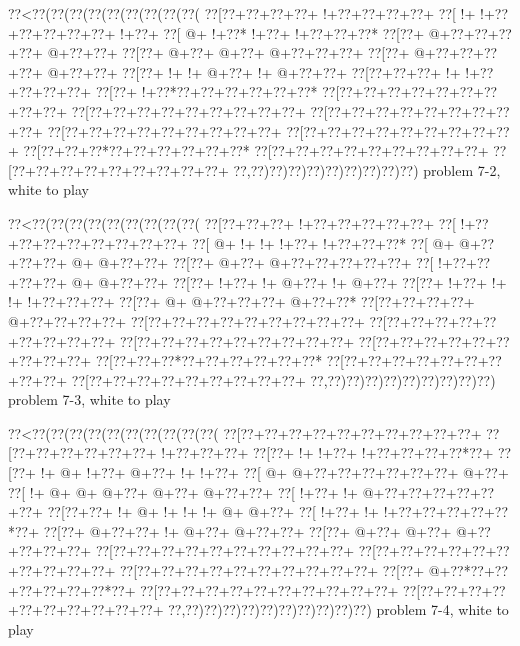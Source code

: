 \vbox{\vbox{\goo
\0??<\0??(\0??(\0??(\0??(\0??(\0??(\0??(\0??(\0??(
\0??[\0??+\0??+\0??+\0??+\- !+\0??+\0??+\0??+\0??+
\0??[\- !+\- !+\0??+\0??+\0??+\0??+\0??+\- !+\0??+
\0??[\- @+\- !+\0??*\- !+\0??+\- !+\0??+\0??+\0??*
\0??[\0??+\- @+\0??+\0??+\0??+\0??+\- @+\0??+\0??+
\0??[\0??+\- @+\0??+\- @+\0??+\- @+\0??+\0??+\0??+
\0??[\0??+\- @+\0??+\0??+\0??+\0??+\- @+\0??+\0??+
\0??[\0??+\- !+\- !+\- @+\0??+\- !+\- @+\0??+\0??+
\0??[\0??+\0??+\0??+\- !+\- !+\0??+\0??+\0??+\0??+
\0??[\0??+\- !+\0??*\0??+\0??+\0??+\0??+\0??+\0??*
\0??[\0??+\0??+\0??+\0??+\0??+\0??+\0??+\0??+\0??+
\0??[\0??+\0??+\0??+\0??+\0??+\0??+\0??+\0??+\0??+
\0??[\0??+\0??+\0??+\0??+\0??+\0??+\0??+\0??+\0??+
\0??[\0??+\0??+\0??+\0??+\0??+\0??+\0??+\0??+\0??+
\0??[\0??+\0??+\0??+\0??+\0??+\0??+\0??+\0??+\0??+
\0??[\0??+\0??+\0??*\0??+\0??+\0??+\0??+\0??+\0??*
\0??[\0??+\0??+\0??+\0??+\0??+\0??+\0??+\0??+\0??+
\0??[\0??+\0??+\0??+\0??+\0??+\0??+\0??+\0??+\0??+
\0??,\0??)\0??)\0??)\0??)\0??)\0??)\0??)\0??)\0??)
}
\hfil problem 7-2, white to play\hfil\break
}

\vbox{\vbox{\goo
\0??<\0??(\0??(\0??(\0??(\0??(\0??(\0??(\0??(\0??(
\0??[\0??+\0??+\0??+\- !+\0??+\0??+\0??+\0??+\0??+
\0??[\- !+\0??+\0??+\0??+\0??+\0??+\0??+\0??+\0??+
\0??[\- @+\- !+\- !+\- !+\0??+\- !+\0??+\0??+\0??*
\0??[\- @+\- @+\0??+\0??+\0??+\- @+\- @+\0??+\0??+
\0??[\0??+\- @+\0??+\- @+\0??+\0??+\0??+\0??+\0??+
\0??[\- !+\0??+\0??+\0??+\0??+\- @+\- @+\0??+\0??+
\0??[\0??+\- !+\0??+\- !+\- @+\0??+\- !+\- @+\0??+
\0??[\0??+\- !+\0??+\- !+\- !+\- !+\0??+\0??+\0??+
\0??[\0??+\- @+\- @+\0??+\0??+\0??+\- @+\0??+\0??*
\0??[\0??+\0??+\0??+\0??+\- @+\0??+\0??+\0??+\0??+
\0??[\0??+\0??+\0??+\0??+\0??+\0??+\0??+\0??+\0??+
\0??[\0??+\0??+\0??+\0??+\0??+\0??+\0??+\0??+\0??+
\0??[\0??+\0??+\0??+\0??+\0??+\0??+\0??+\0??+\0??+
\0??[\0??+\0??+\0??+\0??+\0??+\0??+\0??+\0??+\0??+
\0??[\0??+\0??+\0??*\0??+\0??+\0??+\0??+\0??+\0??*
\0??[\0??+\0??+\0??+\0??+\0??+\0??+\0??+\0??+\0??+
\0??[\0??+\0??+\0??+\0??+\0??+\0??+\0??+\0??+\0??+
\0??,\0??)\0??)\0??)\0??)\0??)\0??)\0??)\0??)\0??)
}
\hfil problem 7-3, white to play\hfil\break
}

\vbox{\vbox{\goo
\0??<\0??(\0??(\0??(\0??(\0??(\0??(\0??(\0??(\0??(\0??(
\0??[\0??+\0??+\0??+\0??+\0??+\0??+\0??+\0??+\0??+\0??+
\0??[\0??+\0??+\0??+\0??+\0??+\0??+\- !+\0??+\0??+\0??+
\0??[\0??+\- !+\- !+\0??+\- !+\0??+\0??+\0??+\0??*\0??+
\0??[\0??+\- !+\- @+\- !+\0??+\- @+\0??+\- !+\- !+\0??+
\0??[\- @+\- @+\0??+\0??+\0??+\0??+\0??+\0??+\- @+\0??+
\0??[\- !+\- @+\- @+\- @+\0??+\- @+\0??+\- @+\0??+\0??+
\0??[\- !+\0??+\- !+\- @+\0??+\0??+\0??+\0??+\0??+\0??+
\0??[\0??+\0??+\- !+\- @+\- !+\- !+\- !+\- @+\- @+\0??+
\0??[\- !+\0??+\- !+\- !+\0??+\0??+\0??+\0??+\0??*\0??+
\0??[\0??+\- @+\0??+\0??+\- !+\- @+\0??+\- @+\0??+\0??+
\0??[\0??+\- @+\0??+\- @+\0??+\- @+\0??+\0??+\0??+\0??+
\0??[\0??+\0??+\0??+\0??+\0??+\0??+\0??+\0??+\0??+\0??+
\0??[\0??+\0??+\0??+\0??+\0??+\0??+\0??+\0??+\0??+\0??+
\0??[\0??+\0??+\0??+\0??+\0??+\0??+\0??+\0??+\0??+\0??+
\0??[\0??+\- @+\0??*\0??+\0??+\0??+\0??+\0??+\0??*\0??+
\0??[\0??+\0??+\0??+\0??+\0??+\0??+\0??+\0??+\0??+\0??+
\0??[\0??+\0??+\0??+\0??+\0??+\0??+\0??+\0??+\0??+\0??+
\0??,\0??)\0??)\0??)\0??)\0??)\0??)\0??)\0??)\0??)\0??)
}
\hfil problem 7-4, white to play\hfil\break
}

